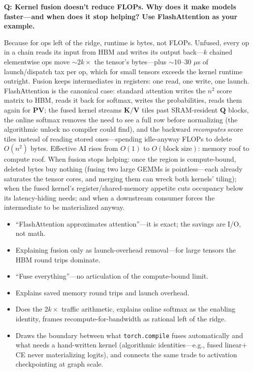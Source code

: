 \begin{interviewq}
\textbf{Q: Kernel fusion doesn't reduce FLOPs. Why does it make models faster---and when does it stop helping? Use FlashAttention as your example.}

 \quad {} \quad \badgefreq{\freqmed}

\stronganswer Because for ops left of the ridge, runtime is bytes, not FLOPs. Unfused, every op in a chain reads its input from HBM and writes its output back---$k$ chained elementwise ops move $\sim 2k\times$ the tensor's bytes---plus $\sim$10--30 $\mu$s of launch/dispatch tax per op, which for small tensors exceeds the kernel runtime outright. Fusion keeps intermediates in registers: one read, one write, one launch. FlashAttention is the canonical case: standard attention writes the $n^2$ score matrix to HBM, reads it back for softmax, writes the probabilities, reads them again for $\mathbf{P}\mathbf{V}$; the fused kernel streams $\mathbf{K}/\mathbf{V}$ tiles past SRAM-resident $\mathbf{Q}$ blocks, the online softmax removes the need to see a full row before normalizing (the algorithmic unlock no compiler could find), and the backward \textit{recomputes} score tiles instead of reading stored ones---spending idle-anyway FLOPs to delete $O(n^2)$ bytes. Effective AI rises from $O(1)$ to $O(\text{block size})$: memory roof to compute roof. When fusion stops helping: once the region is compute-bound, deleted bytes buy nothing (fusing two large GEMMs is pointless---each already saturates the tensor cores, and merging them can wreck both kernels' tiling); when the fused kernel's register/shared-memory appetite cuts occupancy below its latency-hiding needs; and when a downstream consumer forces the intermediate to be materialized anyway.

\redflags
\begin{itemize}
    \item ``FlashAttention approximates attention''---it is exact; the savings are I/O, not math.
    \item Explaining fusion only as launch-overhead removal---for large tensors the HBM round trips dominate.
    \item ``Fuse everything''---no articulation of the compute-bound limit.
\end{itemize}

\goodgreat
\begin{itemize}
    \item {} Explains saved memory round trips and launch overhead.
    \item {} Does the $2k\times$ traffic arithmetic, explains online softmax as the enabling identity, frames recompute-for-bandwidth as rational left of the ridge.
    \item {} Draws the boundary between what \texttt{torch.compile} fuses automatically and what needs a hand-written kernel (algorithmic identities---e.g., fused linear$+$CE never materializing logits), and connects the same trade to activation checkpointing at graph scale.
\end{itemize}


\end{interviewq}
